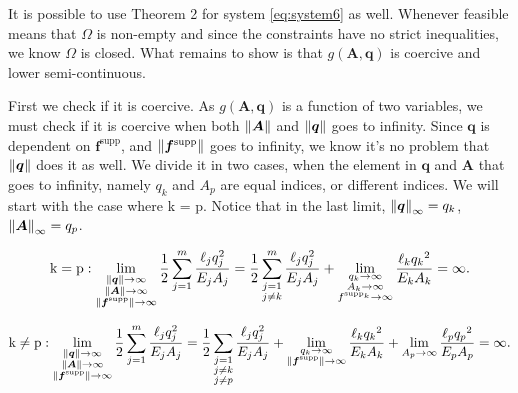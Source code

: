 It is possible to use Theorem 2 \cite{optThe} for system \eqref{eq:system6} as well. Whenever feasible means that $\Omega$ is non-empty and since the constraints have no strict inequalities, we know $\Omega$ is closed. What remains to show is that $g(\bm{A},\bm{q})$ is coercive and lower semi-continuous. 

First we check if it is coercive. As $g(\bm{A},\bm{q})$ is a function of two variables, we must check if it is coercive when both $\left\|\bm{A}\right\|$ and $\left\|\bm{q}\right\|$ goes to infinity. Since $\bm{q}$ is dependent on $\bm{f}^{\textrm{supp}}$, and $\left\|\bm{f}^{\textrm{supp}}\right\|$ goes to infinity, we know it's no problem that $\left\|\bm{q}\right\|$ does it as well.  We divide it in two cases, when the element in $\bm{q}$ and $\bm{A}$ that goes to infinity, namely $q_{k}$ and $A_{p}$ are equal indices, or different indices. We will start with the case where k = p. Notice that in the last limit, $\left\|\bm{q}\right\|_\infty = q_{k}$, $\left\|\bm{A}\right\|_\infty = q_{p}$.

\begin{equation}
\begin{aligned}
\textrm{k} = \textrm{p}:
\lim_{\substack{\left\|\bm{q}\right\|\to\infty \\ \left\|\bm{A}\right\|\to\infty \\ \left\|\bm{f}^ {\textrm{supp}}\right\|\to\infty}} \frac{1}{2}\sum_{j=1}^{m}\frac{\ell_{j}q_{j}^{2}}{E_{j}A_{j}} =  \frac{1}{2}\sum_{\substack{j=1 \\ j \neq k}}^{m}\frac{\ell_{j}q_{j}^{2}}{E_{j}A_{j}} + 
\lim_{\substack{{q}_{k}\to\infty \\ {A}_{k}\to\infty \\ f^{\textrm{supp}_{k}}\to\infty}}  \frac{\ell_{k}{q_{k}}^{2}}{E_{k} A_{k}} = \infty.
\end{aligned}
\end{equation}

\begin{equation}
\begin{aligned}
\textrm{k} \neq \textrm{p}:
\lim_{\substack{\left\|\bm{q}\right\|\to\infty \\ \left\|\bm{A}\right\|\to\infty \\ \left\|\bm{f}^ {\textrm{supp}}\right\|\to\infty}} \frac{1}{2}\sum_{j=1}^{m}\frac{\ell_{j}q_{j}^{2}}{E_{j}A_{j}} =  \frac{1}{2}\sum_{\substack{j=1 \\ j \neq k \\ j \neq p}}\frac{\ell_{j}q_{j}^{2}}{E_{j}A_{j}} + 
\lim_{\substack{{q}_{k}\to\infty \\ \left\|\bm{f}^{\textrm{supp}}\right\|\to\infty}}  \frac{\ell_{k}{q_{k}}^{2}}{E_{k} A_{k}}  + \lim_{{A}_{p}\to\infty}  \frac{\ell_{p}{q_{p}}^{2}}{E_{p} A_{p}} = \infty.
\end{aligned}
\end{equation}

